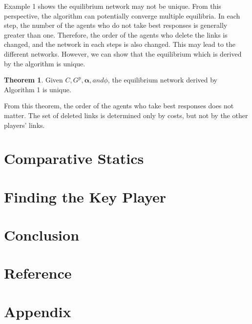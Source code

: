 \documentclass[12pt]{article}
\theoremstyle{definition}
\newtheorem{theorem}{Theorem}
\begin{document}
Example 1 shows the equilibrium network may not be unique.
From this perspective, the algorithm can potentially converge multiple equilibria.
In each step, the number of the agents who do not take best responses is generally greater than one.
Therefore, the order of the agents who delete the links is changed, and the network in each steps is also changed.
This may lead to the different networks.
However, we can show that the equilibrium which is derived by the algorithm is unique.

\begin{theorem}
Given $C, G^p, \bm{\alpha}, and \phi$, the equilibrium network derived by Algorithm 1 is unique.
\end{theorem}

From this theorem, the order of the agents who take best responses does not matter.
The set of deleted links is determined only by costs, but not by the other players' links.


\section{Comparative Statics}


\section{Finding the Key Player}


\section{Conclusion}


\section{Reference}


\section{Appendix}
\end{document}
